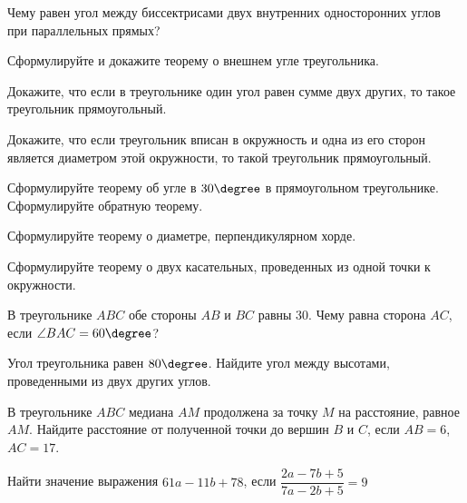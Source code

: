 \begin{listofex}
	\item
	\begin{enumcols}[itemcolumns=1]
		\item Чему равен угол между биссектрисами двух внутренних односторонних углов при параллельных прямых?
		\item Сформулируйте и докажите теорему о внешнем угле треугольника.
		\item Докажите, что если в треугольнике один угол равен сумме двух других, то такое треугольник прямоугольный.
		\item Докажите, что если треугольник вписан в окружность и одна из его сторон является диаметром этой окружности, то такой треугольник прямоугольный.
		\item Сформулируйте теорему об угле в \( 30\degree \) в прямоугольном треугольнике. Сформулируйте обратную теорему.
		\item Сформулируйте теорему о диаметре, перпендикулярном хорде.
		\item Сформулируйте теорему о двух касательных, проведенных из одной точки к окружности.
	\end{enumcols}
	\item В треугольнике \( ABC \) обе стороны \( AB \) и \( BC \) равны \( 30 \). Чему равна сторона \( AC \), если \( \angle BAC = 60 \degree \)?
	\item Угол треугольника равен \( 80\degree \). Найдите угол между высотами, проведенными из двух других углов.
	\item {}
	\item {}
	\item {}
	\item {}
	\item В треугольнике \( ABC \) медиана \( AM \) продолжена за точку \( M \) на расстояние, равное \( AM \). Найдите расстояние от полученной точки до вершин \( B  \) и \( C\), если \( AB = 6\), \( AC = 17\).
	\item {}
	\item Найти значение выражения \( 61a-11b+78 \), если \( \dfrac{2a-7b+5}{7a-2b+5}=9 \)
	
\end{listofex}